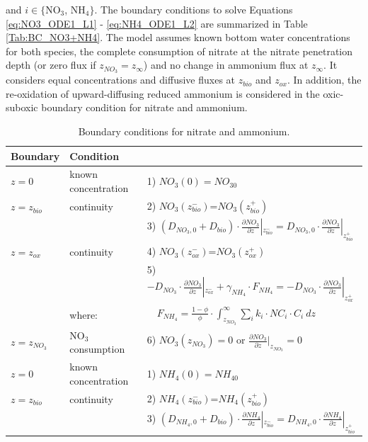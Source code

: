 \documentclass[gmd, manuscript]{copernicus}
\begin{document}
and $i \in \{$NO$_3$, NH$_4\}$. The boundary conditions to solve Equations \ref{eq:NO3_ODE1_L1} - \ref{eq:NH4_ODE1_L2} are summarized in Table \ref{Tab:BC_NO3+NH4}. The model assumes known bottom water concentrations 
for both species, the complete consumption of nitrate at the nitrate penetration depth (or zero flux if $z_{NO_3}=z_\infty$) and no change in ammonium flux at $z_\infty$. It considers equal concentrations and diffusive fluxes 
at $z_{bio}$ and $z_{ox}$.  In addition, the re-oxidation of upward-diffusing reduced ammonium is considered in the oxic-suboxic boundary condition for nitrate and ammonium. 

\begin{table}[tbp]
\caption{Boundary conditions for nitrate and ammonium.}
\centering
\begin{tabular}{ |l| l| l|}
\hline
\textbf{Boundary}& \textbf{Condition}&\\
\hline
$z=0$& known concentration& 1) $NO_3(0)=NO_{30}$  \\
$z=z_{bio}$&continuity& 2) $NO_3(z_{bio}^-)$=$NO_3(z_{bio}^+)$\\
               && 3) $\left(D_{NO_3,0}+D_{bio}\right )\cdot \frac{\partial NO_3}{\partial z}|_{z_{bio}^-}=D_{NO_3,0} \cdot \frac{\partial NO_3}{\partial z}|_{z_{bio}^+}$\\
$z=z_{ox}$& continuity& 4) $NO_3(z_{ox}^-)$=$NO_3(z_{ox}^+)$\\
               && 5) $-D_{NO_3} \cdot \frac{\partial NO_3}{\partial z}|_{z_{ox}^-} + \gamma_{NH_4}\cdot F_{NH_4}=-D_{NO_3} \cdot \frac{\partial NO_3}{\partial z}|_{z_{ox}^+}$\\
&where: & $\quad F_{NH_4}=\frac{1-\phi}{\phi} \cdot \int_{z_{NO_3}}^{\infty}  \sum_i k_i \cdot NC_i \cdot C_i\ dz$ \\          
$z=z_{NO_3}$& NO$_3$ consumption & 6) $NO_3(z_{NO_3})=0$ \quad or \quad $\frac{\partial NO_3}{\partial z}|_{z_{NO_3}}=0$\\
\hline
$z=0$& known concentration& 1) $NH_4(0)=NH_{40}$  \\
$z=z_{bio}$&continuity& 2) $NH_4(z_{bio}^-)$=$NH_4(z_{bio}^+)$\\
               && 3) $\left(D_{NH_4,0}+D_{bio}\right )\cdot \frac{\partial NH_4}{\partial z}|_{z_{bio}^-}=D_{NH_4,0} \cdot \frac{\partial NH_4}{\partial z}|_{z_{bio}^+}$\\

\end{tabular}
\end{table}
\end{document}
